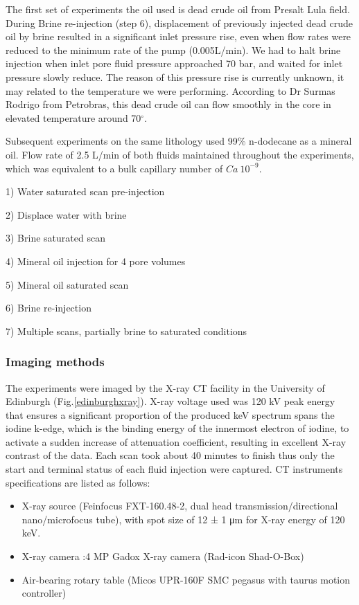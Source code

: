 The first set of experiments the oil used is dead crude oil from Presalt Lula field. During Brine re-injection (step 6), displacement of previously injected dead crude oil by brine resulted in a significant inlet pressure rise, even when flow rates were reduced to the minimum rate of the pump (0.005\textmu L/min). We had to halt brine injection when inlet pore fluid pressure approached 70 bar, and waited for inlet pressure slowly reduce. The reason of this pressure rise is currently unknown, it may related to the temperature we were performing. According to Dr Surmas Rodrigo from Petrobras, this dead crude oil can flow smoothly in the core in elevated temperature around 70$^{\circ}$.

Subsequent experiments on the same lithology used 99\% n-dodecane as a mineral oil. Flow rate of 2.5 \textmu L/min of both fluids maintained throughout the experiments, which was equivalent to a bulk capillary number of $Ca ~ 10^{-9}$. 

1) Water saturated scan pre-injection

2) Displace water with brine 

3) Brine saturated scan 

4) Mineral oil injection for 4 pore volumes

5) Mineral oil saturated scan 

6) Brine re-injection

7) Multiple scans, partially brine to saturated conditions

\subsubsection{Imaging methods}

The experiments were imaged by the X-ray \textmu CT facility in the University of Edinburgh (Fig.\ref{edinburghxray}). X-ray voltage used was 120 kV peak energy that ensures a significant proportion of the produced keV spectrum spans the iodine k-edge, which is the binding energy of the innermost electron of iodine, to activate a sudden increase of attenuation coefficient, resulting in excellent X-ray contrast of the data. Each scan took about 40 minutes to finish thus only the start and terminal status of each fluid injection were captured. CT instruments specifications are listed as follows:

\begin{itemize}
 \item X-ray source (Feinfocus FXT-160.48-2, dual head transmission/directional nano/microfocus tube), with spot size of 12 ± 1 μm for X-ray energy of 120 keV. 
 \item X-ray camera :4 MP Gadox X-ray camera (Rad-icon Shad-O-Box)
 \item Air-bearing rotary table (Micos UPR-160F SMC pegasus with taurus motion controller)
\end{itemize}

